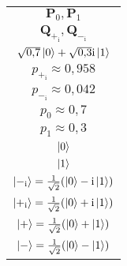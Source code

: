 \documentclass{standalone}
\renewcommand{\i}{{\mathrm i}}
\newcommand{\mat}[1]{\mathbf{#1}}
\begin{document}
\begin{tabular}{c}
$\mat{P}_0, \mat{P}_1$\\
$\mat{Q}_{+_\mathrm{i}}, \mat{Q}_{-_\mathrm{i}}$\\
$\sqrt{0{,}7}\ket{0}+\sqrt{0{,}3}\i\ket{1}$\\
$p_{+_\i}\approx 0{,}958$\\
$p_{-_\i}\approx 0{,}042$\\
$p_{0}\approx 0{,}7$\\
$p_{1}\approx 0{,}3$\\
$\ket{0}$\\
$\ket{1}$\\
$\ket{-_\i}=\frac{1}{\sqrt{2}} (\ket{0}-\i\ket{1})$\\
$\ket{+_\i}=\frac{1}{\sqrt{2}} (\ket{0}+\i\ket{1})$\\
$\ket{+}=\frac{1}{\sqrt{2}} (\ket{0}+\ket{1})$\\
$\ket{-}=\frac{1}{\sqrt{2}} (\ket{0}-\ket{1})$
\end{tabular}
\end{document}
